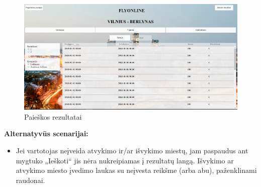 \documentclass{VUMIFPSkursinis}
\begin{document}
\begin{enumerate}[label=\textbf{U\arabic*}.]
                    \begin{figure}[H]
                        \centering
                        \includegraphics[scale=0.4]{img/search_one_way}
                        \caption{Paieškos rezultatai}
                        \label{rezultatai}
                    \end{figure}
                    \textbf{Alternatyvūs scenarijai:}
                    \begin{itemize}
                        \item Jei vartotojas neįveida atvykimo ir/ar išvykimo miestų, jam paspaudus ant mygtuko „Ieškoti“ jis nėra nukreipiamas į rezultatų langą. Išvykimo ar atvykimo miesto įvedimo laukas su neįvesta reikšme (arba abu), paženklinami raudonai.
                    \end{itemize}


\end{enumerate}
\end{document}
